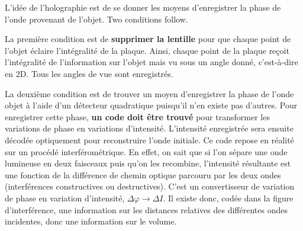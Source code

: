 \begin{figure}[h!]
  \centering
\end{figure}

L'idée de l'holographie est de se donner les moyens d'enregistrer la phase de
l'onde provenant de l'objet. Two conditions follow.

\begin{subpart}
  \item La première condition est de \textbf{supprimer la lentille} pour que
    chaque point de l'objet éclaire l'intégralité de la plaque. Ainsi, chaque
    point de la plaque reçoit l'intégralité de l'information sur l'objet mais vu
    sous un angle donné, c'est-à-dire en 2D. Tous les angles de vue sont
    enregistrés.
  \item La deuxième condition est de trouver un moyen d'enregistrer la phase de
    l'onde objet à l'aide d'un détecteur quadratique puisqu'il n'en existe pas
    d'autres. Pour enregistrer cette phase, \textbf{un code doit être trouvé}
    pour transformer les variations de phase en variations d'intensité.
    L'intensité enregistrée sera ensuite décodée optiquement pour reconstruire
    l'onde initiale. Ce code repose en réalité sur un procédé interférométrique.
    En effet, on sait que si l'on sépare une onde lumineuse en deux faisceaux
    puis qu'on les recombine, l'intensité résultante est une fonction de la
    différence de chemin optique parcouru par les deux ondes (interférences
    constructives ou destructives). C'est un convertisseur de variation de phase
    en variation d'intensité, $\Delta\varphi \to \Delta I$. Il existe donc,
    codée dans la figure d'interférence, une information sur les distances
    relatives des différentes ondes incidentes, donc une information sur le
    volume.
\end{subpart}


